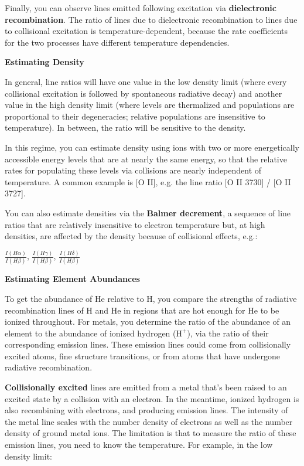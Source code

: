 \documentclass[12pt, letterpaper, preprint]{aastex}
\begin{document}
\begin{enumerate}
Finally, you can observe lines emitted following excitation via \textbf{dielectronic recombination}. The ratio of lines due to dielectronic recombination to lines due to collisional excitation is temperature-dependent, because the rate coefficients for the two processes have different temperature dependencies. 

\textbf{Estimating Density}

In general, line ratios will have one value in the low density limit (where every collisional excitation is followed by spontaneous radiative decay) and another value in the high density limit (where levels are thermalized and populations are proportional to their degeneracies; relative populations are insensitive to temperature). In between, the ratio will be sensitive to the density.

In this regime, you can estimate density using ions with two or more energetically accessible energy levels that are at nearly the same energy, so that the relative rates for populating these levels via collisions are nearly independent of temperature. A common example is [O II], e.g. the line ratio [O II 3730] / [O II 3727]. 

You can also estimate densities via the \textbf{Balmer decrement}, a sequence of line ratios that are relatively insensitive to electron temperature but, at high densities, are affected by the density because of collisional effects, e.g.:

$\frac{I (H \alpha)}{I (H \beta)}$,
$\frac{I (H \gamma)}{I (H \beta)}$,
$\frac{I (H \delta)}{I (H \beta)}$ \newline

\textbf{Estimating Element Abundances}

To get the abundance of He relative to H, you compare the strengths of radiative recombination lines of H and He in regions that are hot enough for He to be ionized throughout.
For metals, you determine the ratio of the abundance of an element
to the abundance of ionized hydrogen ($\mathrm{H}^+$),
via the ratio of their corresponding emission lines.
These emission lines could come from collisionally excited atoms,
fine structure transitions,
or from atoms that have undergone radiative recombination.

\textbf{Collisionally excited} lines are emitted from a metal that's been
raised to an excited state by a collision with an electron.
In the meantime, ionized hydrogen is also recombining with electrons,
and producing emission lines. 
The intensity of the metal line scales with the number density of electrons
as well as the number density of ground metal ions. 
The limitation is that to measure the ratio of these emission lines, you need to know the temperature. For example, in the low density limit:


\end{enumerate}
\end{document}
